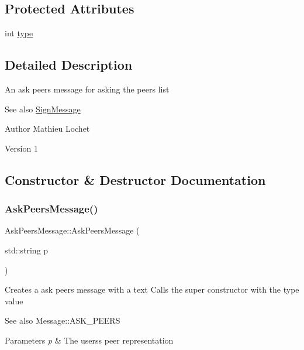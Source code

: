 \subsection*{Protected Attributes}
\begin{DoxyCompactItemize}
\item 
int \mbox{\hyperlink{classMessage_afbfb481c98b13d0deba0bac443bebe29}{type}}
\end{DoxyCompactItemize}


\subsection{Detailed Description}
An ask peers message for asking the peers list \begin{DoxySeeAlso}{See also}
\mbox{\hyperlink{classSignMessage}{Sign\+Message}}
\end{DoxySeeAlso}
\begin{DoxyAuthor}{Author}
Mathieu Lochet 
\end{DoxyAuthor}
\begin{DoxyVersion}{Version}
1 
\end{DoxyVersion}


\subsection{Constructor \& Destructor Documentation}
\mbox{\label{classAskPeersMessage_a55a68df97385093ce959c101b2331bf5}} 
\subsubsection{\texorpdfstring{Ask\+Peers\+Message()}{AskPeersMessage()}}
{\footnotesize\ttfamily Ask\+Peers\+Message\+::\+Ask\+Peers\+Message (\begin{DoxyParamCaption}\item[{std\+::string}]{p }\end{DoxyParamCaption})}

Creates a ask peers message with a text Calls the super constructor with the type value \begin{DoxySeeAlso}{See also}
Message\+::\+A\+S\+K\+\_\+\+P\+E\+E\+RS
\end{DoxySeeAlso}

\begin{DoxyParams}{Parameters}
{\em p} & The users\textquotesingle{}s peer representation \\
\hline
\end{DoxyParams}


